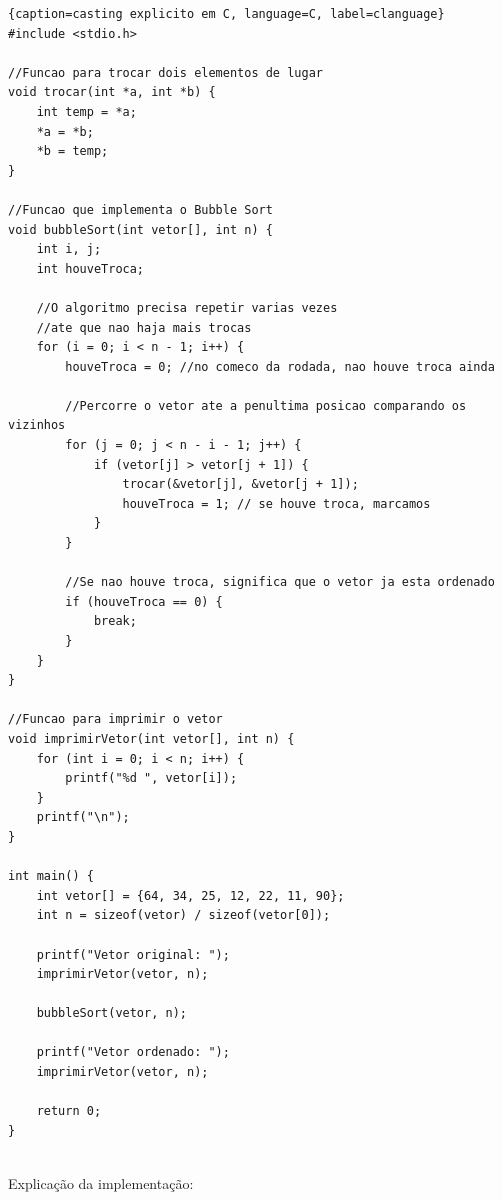 \documentclass{report}
\begin{document}
	\begin{center}
		
		\begin{lstlisting}{caption=casting explicito em C, language=C, label=clanguage}
#include <stdio.h>
	
//Funcao para trocar dois elementos de lugar
void trocar(int *a, int *b) {
	int temp = *a;
	*a = *b;
	*b = temp;
}
	
//Funcao que implementa o Bubble Sort
void bubbleSort(int vetor[], int n) {
	int i, j;
	int houveTroca;
		
	//O algoritmo precisa repetir varias vezes
	//ate que nao haja mais trocas
	for (i = 0; i < n - 1; i++) {
		houveTroca = 0; //no comeco da rodada, nao houve troca ainda
			
		//Percorre o vetor ate a penultima posicao comparando os vizinhos
		for (j = 0; j < n - i - 1; j++) {
			if (vetor[j] > vetor[j + 1]) {
				trocar(&vetor[j], &vetor[j + 1]);
				houveTroca = 1; // se houve troca, marcamos
			}
		}
			
		//Se nao houve troca, significa que o vetor ja esta ordenado
		if (houveTroca == 0) {
			break;
		}
	}
}
	
//Funcao para imprimir o vetor
void imprimirVetor(int vetor[], int n) {
	for (int i = 0; i < n; i++) {
		printf("%d ", vetor[i]);
	}
	printf("\n");
}
	
int main() {
	int vetor[] = {64, 34, 25, 12, 22, 11, 90};
	int n = sizeof(vetor) / sizeof(vetor[0]);
		
	printf("Vetor original: ");
	imprimirVetor(vetor, n);
		
	bubbleSort(vetor, n);
		
	printf("Vetor ordenado: ");
	imprimirVetor(vetor, n);
		
	return 0;
}
				
		\end{lstlisting}
	\end{center}
	
	Explicação da implementação:
	
\end{document}

